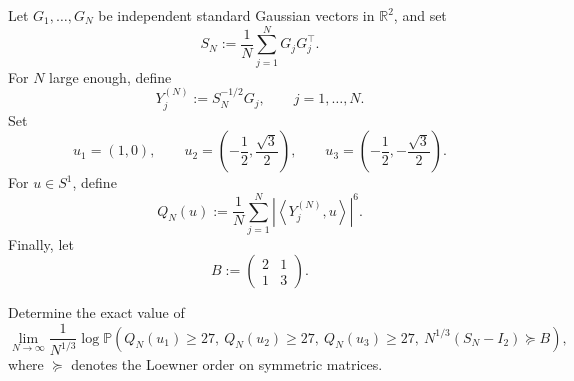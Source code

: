 Let \(G_1,\dots,G_N\) be independent standard Gaussian vectors in
\(\mathbb{R}^2\), and set
\[
    S_N:=\frac{1}{N}\sum_{j=1}^N G_jG_j^{\top}.
\]
For \(N\) large enough, define
\[
    Y_j^{(N)}:=S_N^{-1/2}G_j,
    \qquad j=1,\dots,N.
\]
Set
\[
    u_1=(1,0),
    \qquad
    u_2=\left(-\frac{1}{2},\frac{\sqrt3}{2}\right),
    \qquad
    u_3=\left(-\frac{1}{2},-\frac{\sqrt3}{2}\right).
\]
For \(u\in S^1\), define
\[
    Q_N(u)
    :=
    \frac{1}{N}
    \sum_{j=1}^N
    \left|
        \left\langle Y_j^{(N)},u\right\rangle
    \right|^6 .
\]
Finally, let
\[
    B:=
    \begin{pmatrix}
        2 & 1\\
        1 & 3
    \end{pmatrix}.
\]

Determine the exact value of
\[
    \lim_{N\to\infty}
    \frac{1}{N^{1/3}}
    \log
    \mathbb{P}\left(
        Q_N(u_1)\ge 27,\ 
        Q_N(u_2)\ge 27,\ 
        Q_N(u_3)\ge 27,\ 
        N^{1/3}(S_N-I_2)\succeq B
    \right),
\]
where \(\succeq\) denotes the Loewner order on symmetric matrices.
